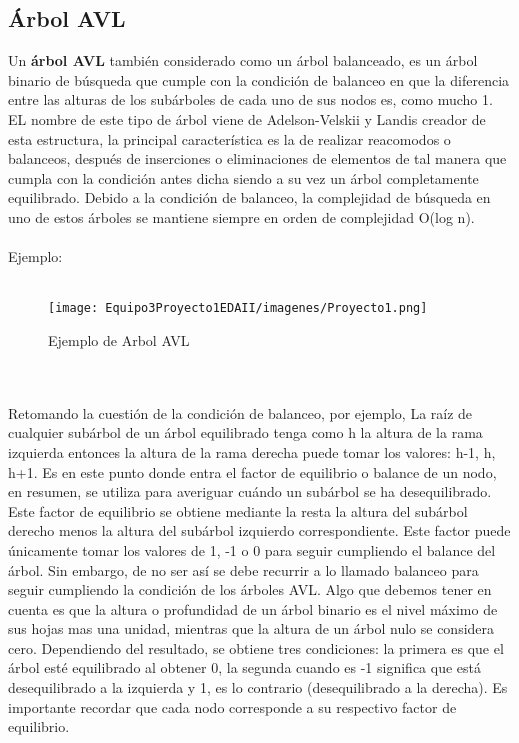 \documentclass{report}
\begin{document}
\subsection{Árbol AVL}
Un \textbf{árbol AVL} también considerado como un árbol balanceado, es un árbol binario de búsqueda que cumple con la condición de balanceo en que la diferencia entre las alturas de los subárboles de cada uno de sus nodos es, como mucho 1. 
EL nombre de este tipo de árbol viene de Adelson-Velskii y Landis creador de esta estructura, la principal característica es la de realizar reacomodos o balanceos, después de inserciones o eliminaciones de elementos de tal manera que cumpla con la condición antes dicha siendo a su vez un árbol completamente equilibrado.
Debido a la condición de balanceo, la complejidad de búsqueda en uno de estos árboles se mantiene siempre en orden de complejidad O(log n).\\\\
Ejemplo:\\\\
\begin{figure}[h]
        \centering
        \texttt{[image: Equipo3Proyecto1EDAII/imagenes/Proyecto1.png]}
        \caption{Ejemplo de Arbol AVL}
        \label{fig:my_label}
    \end{figure}{}\\\\
Retomando la cuestión de la condición de balanceo, por ejemplo, La raíz de cualquier subárbol de un árbol equilibrado tenga como h la altura de la rama izquierda entonces la altura de la rama derecha puede tomar los valores: h-1, h, h+1. Es en este punto donde entra el factor de equilibrio o balance de un nodo, en resumen, se utiliza para averiguar cuándo un subárbol se ha desequilibrado. 
Este factor de equilibrio se obtiene mediante la resta la altura del subárbol derecho menos la altura del subárbol izquierdo correspondiente. Este factor puede únicamente tomar los valores de 1, -1 o 0 para seguir cumpliendo el balance del árbol. Sin embargo, de no ser así se debe recurrir a lo llamado balanceo para seguir cumpliendo la condición de los árboles AVL. Algo que debemos tener en cuenta es que la altura o profundidad de un árbol binario es el nivel máximo de sus hojas mas una unidad, mientras que la altura de un árbol nulo se considera cero. Dependiendo del resultado, se obtiene tres condiciones: la primera es que el árbol esté equilibrado al obtener 0, la segunda cuando es -1 significa que está desequilibrado a la izquierda y 1, es lo contrario (desequilibrado a la derecha). Es importante recordar que cada nodo corresponde a su respectivo factor de equilibrio.\\\\
\end{document}
